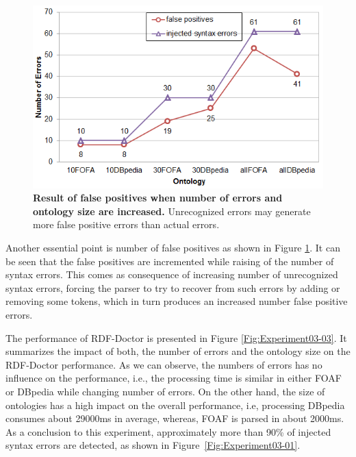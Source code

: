 \begin{figure}[ht]
\begin{center}
		\includegraphics[scale=0.9,angle=0]{images/Experiment03-02.png}
		\setlength\belowcaptionskip{-5mm}
		\setlength\abovecaptionskip{-50mm}
		\caption{\textbf{Result of false positives when number of errors and ontology size are increased.} Unrecognized errors may generate more false positive errors than actual errors. 
		}
   \label{Fig:Experiment03-02}
\end{center}
\end{figure}
Another essential point is number of false positives as shown in Figure \ref{Fig:Experiment03-02}. 
It can be seen that the false positives are incremented while raising of the number of syntax errors.
This comes as consequence of increasing number of unrecognized syntax errors, forcing the parser to try to recover from such errors by adding or removing some tokens, which in turn produces an increased number false positive errors.   


The performance of RDF-Doctor is presented in Figure \ref{Fig:Experiment03-03}. 
It summarizes the impact of both, the number of errors and the ontology size on the RDF-Doctor performance.
As we can observe, the numbers of errors has no influence on the performance, i.e., the processing time is similar in either FOAF or DBpedia while changing number of errors. 
On the other hand, the size of ontologies has a high impact on the overall performance, i.e, processing DBpedia consumes about 29000ms in average, whereas, FOAF is parsed in about 2000ms.   
As a conclusion to this experiment, approximately more than 90\% of injected syntax errors are detected, as shown in Figure~\ref{Fig:Experiment03-01}. 

